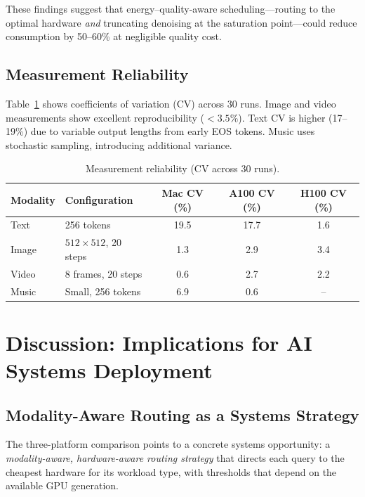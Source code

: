 \documentclass[acmlarge,manuscript,screen,review]{acmart}
\begin{document}
These findings suggest that energy--quality-aware scheduling---routing to the optimal hardware \emph{and} truncating denoising at the saturation point---could reduce consumption by 50--60\% at negligible quality cost.

\subsection{Measurement Reliability}

Table~\ref{tab:reliability} shows coefficients of variation (CV) across 30 runs. Image and video measurements show excellent reproducibility ($<3.5\%$). Text CV is higher (17--19\%) due to variable output lengths from early EOS tokens. Music uses stochastic sampling, introducing additional variance.

\begin{table}[t]
\centering
\caption{Measurement reliability (CV across 30 runs).}
\label{tab:reliability}
\small
\begin{tabular}{@{}llccc@{}}
\toprule
\textbf{Modality} & \textbf{Configuration} & \textbf{Mac CV (\%)} & \textbf{A100 CV (\%)} & \textbf{H100 CV (\%)} \\
\midrule
Text & 256 tokens & 19.5 & 17.7 & 1.6 \\
Image & $512 \times 512$, 20 steps & 1.3 & 2.9 & 3.4 \\
Video & 8 frames, 20 steps & 0.6 & 2.7 & 2.2 \\
Music & Small, 256 tokens & 6.9 & 0.6 & -- \\
\bottomrule
\end{tabular}
\end{table}

\section{Discussion: Implications for AI Systems Deployment}
\label{sec:discussion}

\subsection{Modality-Aware Routing as a Systems Strategy}

The three-platform comparison points to a concrete systems opportunity: a \emph{modality-aware, hardware-aware routing strategy} that directs each query to the cheapest hardware for its workload type, with thresholds that depend on the available GPU generation.
\end{document}
